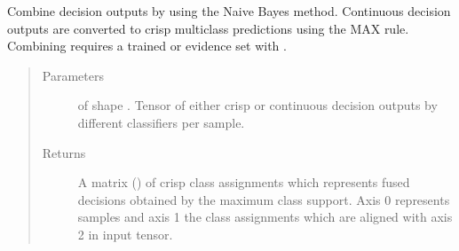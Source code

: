 \documentclass[letterpaper,10pt,english]{sphinxmanual}
\begin{document}
\begin{fulllineitems}
\begin{fulllineitems}
\label{\detokenize{pusion.core.naive_bayes_combiner:pusion.core.naive_bayes_combiner.NaiveBayesCombiner.combine}}
\sphinxAtStartPar
Combine decision outputs by using the Naive Bayes method.
Continuous decision outputs are converted to crisp multiclass predictions using the MAX rule.
Combining requires a trained {\hyperref[\detokenize{pusion.core.naive_bayes_combiner:pusion.core.naive_bayes_combiner.NaiveBayesCombiner}]{}} or evidence set with .
\begin{quote}\begin{description}
\item[{Parameters}] \leavevmode
\sphinxAtStartPar
{} \textendash{}  of shape .
Tensor of either crisp or continuous decision outputs by different classifiers per sample.

\item[{Returns}] \leavevmode
\sphinxAtStartPar
A matrix () of crisp class assignments which represents fused
decisions obtained by the maximum class support. Axis 0 represents samples and axis 1 the class
assignments which are aligned with axis 2 in  input tensor.

\end{description}\end{quote}

\end{fulllineitems}


\end{fulllineitems}

\end{document}
